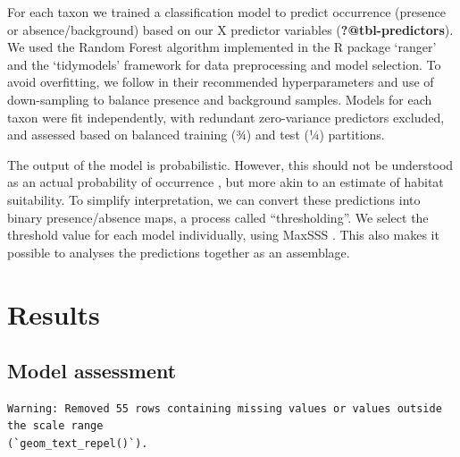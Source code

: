 \documentclass[
  authoryear,
  review]{elsarticle}
\begin{document}
For each taxon we trained a classification model to predict occurrence
(presence or absence/background) based on our X predictor variables
(\textbf{?@tbl-predictors}). We used the Random Forest algorithm
implemented in the R package `ranger' \citep{WrightZiegler2017} and the
`tidymodels' \citep{tidymodels} framework for data preprocessing and
model selection. To avoid overfitting, we follow \citet{ValaviEtAl2021}
in their recommended hyperparameters and use of down-sampling to balance
presence and background samples. Models for each taxon were fit
independently, with redundant zero-variance predictors excluded, and
assessed based on balanced training (¾) and test (¼) partitions.

The output of the model is probabilistic. However, this should not be
understood as an actual probability of occurrence \citep{CITE}, but more
akin to an estimate of habitat suitability. To simplify interpretation,
we can convert these predictions into binary presence/absence maps, a
process called ``thresholding''. We select the threshold value for each
model individually, using MaxSSS \citep[as recommended
by][]{LiuEtAl2013}. This also makes it possible to analyses the
predictions together as an assemblage.

\section{Results}\label{results}

\subsection{Model assessment}\label{model-assessment}

\begin{verbatim}
Warning: Removed 55 rows containing missing values or values outside the scale range
(`geom_text_repel()`).
\end{verbatim}
\end{document}
